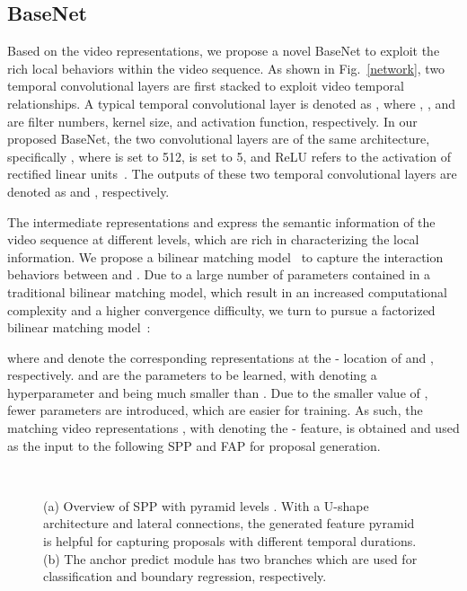 \documentclass[10pt,twocolumn,letterpaper]{article}
\begin{document}
\subsection{BaseNet}
Based on the video representations, we propose a novel BaseNet to exploit the rich local behaviors within the video sequence. As shown in Fig.~\ref{network}, two temporal convolutional layers are first stacked to exploit video temporal relationships. A typical temporal convolutional layer is denoted as , where , , and  are filter numbers, kernel size, and activation function, respectively. In our proposed BaseNet, the two convolutional layers are of the same architecture, specifically , where  is set to 512,  is set to 5, and ReLU refers to the activation of rectified linear units~\cite{relu}. The outputs of these two temporal convolutional layers are denoted as   and , respectively. 

The intermediate representations  and  express the semantic information of the video sequence at different levels, which are rich in characterizing the local information. We propose a bilinear matching model~\cite{bilinear_old} to capture the interaction behaviors between  and . Due to a large number of parameters contained in a traditional bilinear matching model, which result in an increased computational complexity and a higher convergence difficulty, 
we turn to pursue a  factorized bilinear matching model~\cite{bilinear_new,fengyang}:

where  and  denote the corresponding representations at the - location of  and , respectively.  and  are the parameters to be learned, with  denoting a hyperparameter and being much smaller than . Due to the smaller value of , fewer parameters are introduced, which are easier for training. As such, the matching video representations , with  denoting the - feature, is obtained and used as the input to the following SPP and FAP for proposal generation. 


\begin{figure}[!t]
\centering
{}\\
\caption{(a) Overview of SPP with pyramid levels . With a U-shape architecture and lateral connections, the generated  feature pyramid  is helpful for capturing proposals with different temporal durations. (b) The anchor predict module has two branches which are used for classification and boundary regression, respectively.}
\label{segment actionness}
\end{figure}
\end{document}
